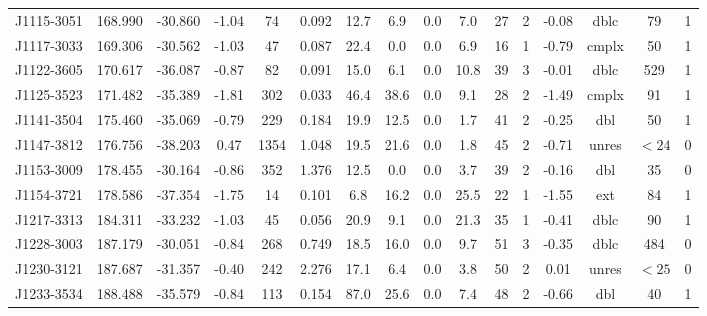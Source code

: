 \documentclass{mnras}
\begin{document}
\begin{table*}
\begin{tabular}{cccccccccccccccc}
J1115-3051 & 168.990 & -30.860 & -1.04 & 74 & 0.092 & 12.7 & 6.9 & 0.0 & 7.0 & 27 & 2 & -0.08 & dblc & 79 & 1 \\ 

J1117-3033 & 169.306 & -30.562 & -1.03 & 47 & 0.087 & 22.4 & 0.0 & 0.0 & 6.9 & 16 & 1 & -0.79 & cmplx & 50 & 1 \\ 

J1122-3605 & 170.617 & -36.087 & -0.87 & 82 & 0.091 & 15.0 & 6.1 & 0.0 & 10.8 & 39 & 3 & -0.01 & dblc & 529 & 1 \\ 

J1125-3523 & 171.482 & -35.389 & -1.81 & 302 & 0.033 & 46.4 & 38.6 & 0.0 & 9.1 & 28 & 2 & -1.49 & cmplx & 91 & 1 \\ 

J1141-3504 & 175.460 & -35.069 & -0.79 & 229 & 0.184 & 19.9 & 12.5 & 0.0 & 1.7 & 41 & 2 & -0.25 & dbl & 50 & 1 \\ 

J1147-3812 & 176.756 & -38.203 & 0.47 & 1354 & 1.048 & 19.5 & 21.6 & 0.0 & 1.8 & 45 & 2 & -0.71 & unres & $<24$ & 0 \\ 

J1153-3009 & 178.455 & -30.164 & -0.86 & 352 & 1.376 & 12.5 & 0.0 & 0.0 & 3.7 & 39 & 2 & -0.16 & dbl & 35 & 0 \\ 

J1154-3721 & 178.586 & -37.354 & -1.75 & 14 & 0.101 & 6.8 & 16.2 & 0.0 & 25.5 & 22 & 1 & -1.55 & ext & 84 & 1 \\

J1217-3313 & 184.311 & -33.232 & -1.03 & 45 & 0.056 & 20.9 & 9.1 & 0.0 & 21.3 & 35 & 1 & -0.41 & dblc & 90 & 1 \\ 

J1228-3003 & 187.179 & -30.051 & -0.84 & 268 & 0.749 & 18.5 & 16.0 & 0.0 & 9.7 & 51 & 3 & -0.35 & dblc & 484 & 0 \\ 

J1230-3121 & 187.687 & -31.357 & -0.40 & 242 & 2.276 & 17.1 & 6.4 & 0.0 & 3.8 & 50 & 2 & 0.01 & unres & $<25$ & 0 \\ 

J1233-3534 & 188.488 & -35.579 & -0.84 & 113 & 0.154 & 87.0 & 25.6 & 0.0 & 7.4 & 48 & 2 & -0.66 & dbl & 40 & 1 \\ 
      \hline
   \end{tabular}%
\label{modelfitsextra}
\end{table*}
\end{document}
